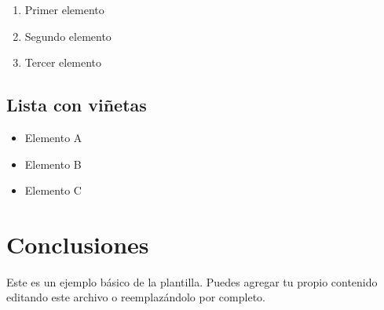 	\begin{enumerate}
		\item Primer elemento
		\item Segundo elemento
		\item Tercer elemento
	\end{enumerate}

	\subsection{Lista con viñetas}

	\begin{itemize}
		\item Elemento A
		\item Elemento B
		\item Elemento C
	\end{itemize}

\section{Conclusiones}

	Este es un ejemplo básico de la plantilla. Puedes agregar tu propio contenido editando este archivo o reemplazándolo por completo.
